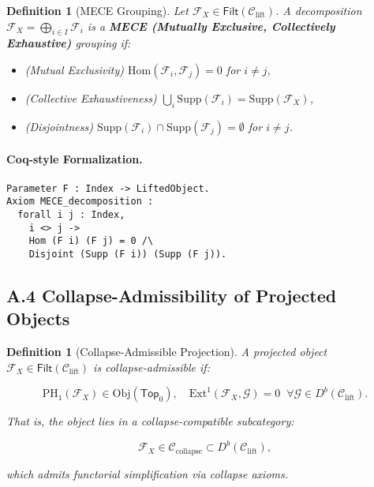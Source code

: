 \documentclass[11pt]{article}
\newtheorem{definition}[theorem]{Definition}
\begin{document}
\begin{definition}[MECE Grouping]
Let \( \mathcal{F}_X \in \mathsf{Filt}(\mathcal{C}_{\mathrm{lift}}) \).  
A decomposition \( \mathcal{F}_X = \bigoplus_{i \in I} \mathcal{F}_i \) is a \textbf{MECE (Mutually Exclusive, Collectively Exhaustive)} grouping if:

\begin{itemize}
  \item (Mutual Exclusivity) \( \mathrm{Hom}(\mathcal{F}_i, \mathcal{F}_j) = 0 \) for \( i \neq j \),
  \item (Collective Exhaustiveness) \( \bigcup_{i} \mathrm{Supp}(\mathcal{F}_i) = \mathrm{Supp}(\mathcal{F}_X) \),
  \item (Disjointness) \( \mathrm{Supp}(\mathcal{F}_i) \cap \mathrm{Supp}(\mathcal{F}_j) = \emptyset \) for \( i \neq j \).
\end{itemize}
\end{definition}

\paragraph{Coq-style Formalization.}

\begin{lstlisting}[language=Coq]
Parameter F : Index -> LiftedObject.
Axiom MECE_decomposition :
  forall i j : Index,
    i <> j ->
    Hom (F i) (F j) = 0 /\
    Disjoint (Supp (F i)) (Supp (F j)).
\end{lstlisting}

\subsection*{A.4 Collapse-Admissibility of Projected Objects}

\begin{definition}[Collapse-Admissible Projection]
A projected object \( \mathcal{F}_X \in \mathsf{Filt}(\mathcal{C}_{\mathrm{lift}}) \) is \emph{collapse-admissible} if:

\[
\mathrm{PH}_1(\mathcal{F}_X) \in \mathrm{Obj}(\mathsf{Top}_0), \quad
\mathrm{Ext}^1(\mathcal{F}_X, \mathcal{G}) = 0 \;\; \forall \mathcal{G} \in D^b(\mathcal{C}_{\mathrm{lift}}).
\]

That is, the object lies in a collapse-compatible subcategory:

\[
\mathcal{F}_X \in \mathcal{C}_{\mathrm{collapse}} \subset D^b(\mathcal{C}_{\mathrm{lift}}),
\]

which admits functorial simplification via collapse axioms.
\end{definition}
\end{document}
